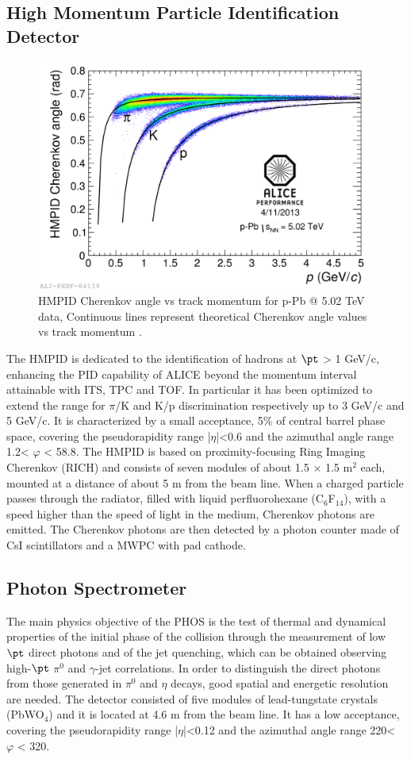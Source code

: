 \subsection*{High Momentum Particle Identification Detector}
\begin{figure}
  \centering
  \includegraphics[scale=0.15]{figures/HMPID.png}
  \caption{HMPID Cherenkov angle vs track momentum for p-Pb @ 5.02 TeV data, Continuous lines represent theoretical Cherenkov angle values vs track momentum \cite{alice2014performance}.}
  \label{fig:HMPID}
\end{figure}
%
The HMPID is dedicated to the identification of hadrons at $\pt$ > 1 GeV/c, enhancing the PID capability of ALICE beyond the momentum interval attainable with ITS, TPC and TOF. In particular it has been optimized to extend the range for $\pi$/K and K/p discrimination respectively up to 3 GeV/c and 5 GeV/c. It is characterized by a small acceptance, 5\% of central barrel phase space, covering the pseudorapidity range |$\eta$|<0.6 and the azimuthal angle range 1.2\textdegree < $\varphi$ < 58.8\textdegree. The HMPID is based on proximity-focusing Ring Imaging Cherenkov (RICH) and consists of seven modules of about 1.5 $\times$ 1.5 m$^2$ each, mounted at a distance of about 5 m from the beam line. When a charged particle passes through the radiator, filled with liquid perfluorohexane (C$_6$F$_{14}$), with a speed higher than the speed of light in the medium, Cherenkov photons are emitted. The Cherenkov photons are then detected by a photon counter made of CsI scintillators and a MWPC with pad cathode.
\subsection*{Photon Spectrometer}
The main physics objective of the PHOS is the test of thermal and dynamical properties of the initial phase of the collision through the measurement of low $\pt$ direct photons and of the jet quenching, which can be obtained observing high-$\pt$ $\pi^0$ and $\gamma$-jet correlations. In order to distinguish the direct photons from those generated in $\pi^0$ and $\eta$ decays, good spatial and energetic resolution are needed. The detector consisted of five modules of lead-tungstate crystals (PbWO$_4$) and it is located at 4.6 m from the beam line. It has a low acceptance, covering the pseudorapidity range |$\eta$|<0.12 and the azimuthal angle range 220\textdegree < $\varphi$ < 320\textdegree.
